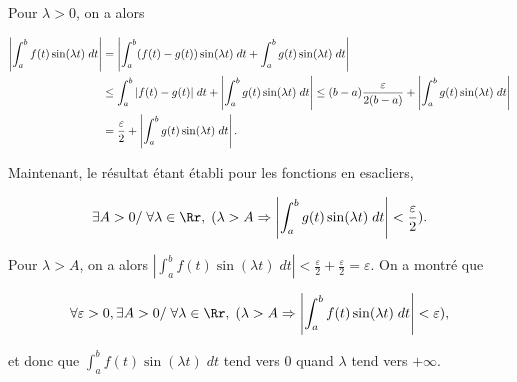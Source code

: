 {\begin{enumerate}
{Pour $\lambda>0$, on a alors 

\begin{align*}\ensuremath
\left|\int_{a}^{b}f(t)\sin(\lambda t)\;dt\right|&=\left|\int_{a}^{b}(f(t)-g(t))\sin(\lambda t)\;dt+\int_{a}^{b}g(t)\sin(\lambda t)\;dt\right|\\
 &\leq\int_{a}^{b}|f(t)-g(t)|\;dt+\left|\int_{a}^{b}g(t)\sin(\lambda  t)\;dt\right|\leq(b-a)\frac{\varepsilon}{2(b-a)}+\left|\int_{a}^{b}g(t)\sin(\lambda t)\;dt\right|\\
 &=\frac{\varepsilon}{2}+\left|\int_{a}^{b}g(t)\sin(\lambda t)\;dt\right|.
\end{align*}

Maintenant, le résultat étant établi pour les fonctions en esacliers, 

$$\exists A>0/\;\forall\lambda\in\Rr,\;
(\lambda>A\Rightarrow\left|\int_{a}^{b}g(t)\sin(\lambda t)\;dt\right|<\frac{\varepsilon}{2}).$$

Pour $\lambda>A$, on a alors $\left|\int_{a}^{b}f(t)\sin(\lambda t)\;dt\right|<\frac{\varepsilon}{2}+\frac{\varepsilon}{2}=\varepsilon$. On a montré que 

$$\forall\varepsilon>0,\exists A>0/\;\forall\lambda\in\Rr,\;(\lambda>A\Rightarrow\left|\int_{a}^{b}f(t)\sin(\lambda t)\;dt\right|<\varepsilon),$$

et donc que $\int_{a}^{b}f(t)\sin(\lambda t)\;dt$ tend vers $0$ quand $\lambda$ tend vers $+\infty$.}
\end{enumerate}
}
